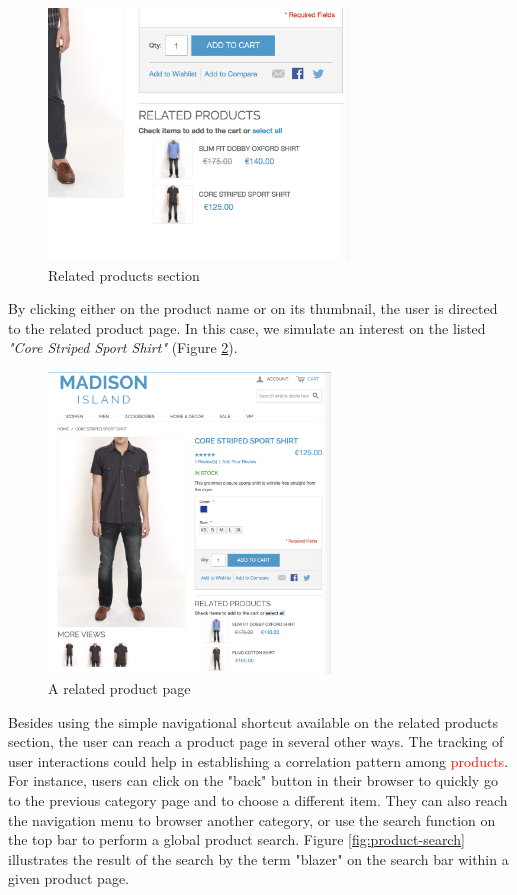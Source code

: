 \vspace{0.5cm}
\begin{figure}[H]
  \centering
    \includegraphics[width=8cm]{images/madison/related-products.png}
  \caption{Related products section}
  \label{fig:related-products}
\end{figure}
\vspace{0.5cm}

By clicking either on the product name or on its thumbnail, the user is directed to the related product page. In this case, we simulate an interest on the listed \textit{"Core Striped Sport Shirt"} (Figure \ref{fig:product-detail2}).

\vspace{0.5cm}
\begin{figure}[H]
  \centering
    \includegraphics[height=8cm]{images/madison/product-detail2.png}
  \caption{A related product page}
  \label{fig:product-detail2}
\end{figure}
\vspace{0.5cm}

Besides using the simple navigational shortcut available on the related products section, the user can reach a product page in several other ways. The tracking of user interactions could help in establishing a correlation pattern among \textcolor{red}{products}. For instance, users can click on the "back" button in their browser to quickly go to the previous category page and to choose a different item. They can also reach the navigation menu to browser another category, or use the search function on the top bar to perform a global product search. 
Figure \ref{fig:product-search} illustrates the result of the search by the term "blazer" on the search bar within a given product page.


